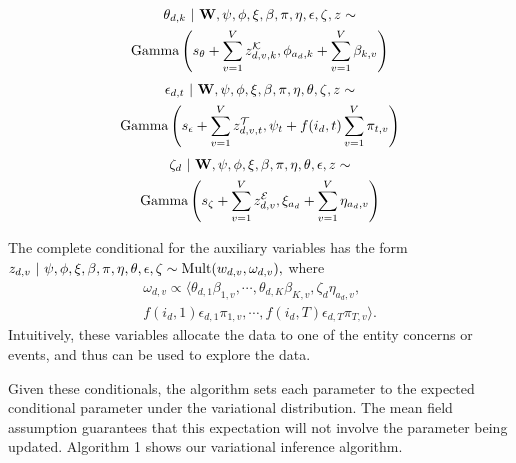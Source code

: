 \begin{multline}
\theta_{d,k} ~\vert~ \mathbf{W}, \psi, \phi, \xi, \beta, \pi, \eta, \epsilon, \zeta, z \sim \\
	\mbox{Gamma}\left(
		s_\theta + \sum_{v=1}^V z^\mathcal{K}_{d,v,k},
		\phi_{a_d,k} + \sum_{v=1}^V \beta_{k,v}
	\right)
\label{eq:theta}
\end{multline}
\begin{multline}
\epsilon_{d,t} ~\vert~ \mathbf{W}, \psi, \phi, \xi, \beta, \pi, \eta, \theta, \zeta, z \sim \\
	\mbox{Gamma}\left(
		s_\epsilon + \sum_{v=1}^V z^\mathcal{T}_{d,v,t},
		\psi_t + f(i_d, t) \sum_{v=1}^V \pi_{t,v}
	\right)
\label{eq:epsilon}
\end{multline}
\begin{multline}
\zeta_{d} ~\vert~ \mathbf{W}, \psi, \phi, \xi, \beta, \pi, \eta, \theta, \epsilon, z \sim \\
	\mbox{Gamma}\left(
		s_\zeta + \sum_{v=1}^V z^\mathcal{E}_{d,v},
		\xi_{a_d} + \sum_{v=1}^V \eta_{a_d,v}
	\right)
\label{eq:zeta}
\end{multline}

The complete conditional for the auxiliary variables has the form
$z_{d,v} ~\vert~ \psi, \phi, \xi, \beta, \pi, \eta, \theta, \epsilon, \zeta \sim \mbox{Mult}(w_{d,v}, \omega_{d,v}),$ where
\begin{multline}
\omega_{d,v} \propto \langle 
\theta_{d,1} \beta_{1,v}, \cdots, \theta_{d,K} \beta_{K,v}, \zeta_d \eta_{a_d,v}, \\
f(i_d, 1) \epsilon_{d,1} \pi_{1,v}, \cdots, f(i_d, T) \epsilon_{d,T} \pi_{T,v}\rangle.
\label{eq:omega}
\end{multline}
Intuitively, these variables allocate the data to one of the entity concerns or events, and thus can be used to explore the data.

Given these conditionals, the algorithm sets each parameter to the expected conditional parameter under the variational distribution. The mean field assumption guarantees that this expectation will not involve the parameter being updated.  Algorithm 1 shows our variational inference algorithm. 



